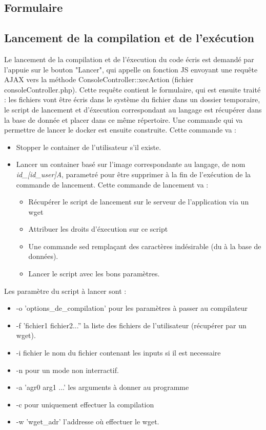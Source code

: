 \subsection{Formulaire}


\subsection{Lancement de la compilation et de l'exécution}

Le lancement de la compilation et de l'éxecution du code écris est demandé par l'appuie sur le bouton "Lancer", qui appelle on fonction JS envoyant une requête AJAX
vers la méthode ConsoleController::xecAction (fichier consoleController.php). Cette requête contient le formulaire, qui est ensuite traité : les fichiers vont être écris dans
le système du fichier dans un dossier temporaire, le script de lancement et d'éxecution correspondant au langage est récupérer dans la base de donnée et placer dans ce même répertoire.
Une commande qui va permettre de lancer le docker est ensuite construite. Cette commande va :
\begin{itemize}
  \item Stopper le container de l'utilisateur s'il existe.
  \item{Lancer un container basé sur l'image correspondante au langage, de nom \emph{id\_[id\_user]A}, parametré pour être supprimer à la fin de l'exécution de la commande de lancement. Cette commande de lancement va :
  \begin{itemize}
    \item Récupérer le script de lancement sur le serveur de l'application via un wget
    \item Attribuer les droits d'éxecution sur ce script
    \item Une commande sed remplaçant des caractères indésirable (du à la base de données).
    \item Lancer le script avec les bons paramètres.
  \end{itemize}}
\end{itemize}

Les paramètre du script à lancer sont :
\begin{itemize}
  \item -o 'options\_de\_compilation' pour les paramètres à passer au compilateur
  \item -f 'fichier1 fichier2...'' la liste des fichiers de l'utilisateur (récupérer par un wget).
  \item -i fichier le nom du fichier contenant les inputs si il est necessaire
  \item -n pour un mode non interractif.
  \item -a 'agr0 arg1 ...' les arguments à donner au programme
  \item -c pour uniquement effectuer la compilation
  \item -w 'wget\_adr' l'addresse où effectuer le wget.
\end{itemize}

